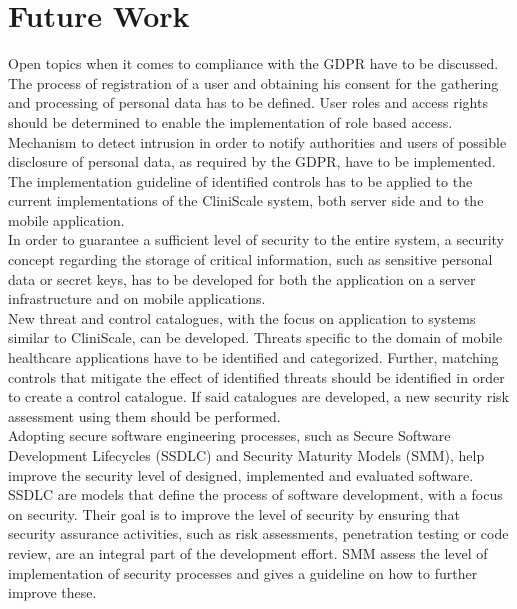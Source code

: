 \section{Future Work}
\label{futurework}
Open topics when it comes to compliance with the GDPR have to be discussed. The process of registration of a user and obtaining his consent for the gathering and processing of personal data has to be defined. User roles and access rights should be determined to enable the implementation of role based access. Mechanism to detect intrusion in order to notify authorities and users of possible disclosure of personal data, as required by the GDPR, have to be implemented.\\
\newline
The implementation guideline of identified controls has to be applied to the current implementations of the CliniScale system, both server side and to the mobile application.\\
\newline
In order to guarantee a sufficient level of security to the entire system, a security concept regarding the storage of critical information, such as sensitive personal data or secret keys, has to be developed for both the application on a server infrastructure and on mobile applications.\\
\newline
New threat and control catalogues, with the focus on application to systems similar to CliniScale, can be developed. Threats specific to the domain of mobile healthcare applications have to be identified and categorized. Further, matching controls that mitigate the effect of identified threats should be identified in order to create a control catalogue. If said catalogues are developed, a new security risk assessment using them should be performed.\\
\newline
Adopting secure software engineering processes, such as Secure Software Development Lifecycles (SSDLC) and Security Maturity Models (SMM), help improve the security level of designed, implemented and evaluated software. SSDLC are models that define the process of software development, with a focus on security. Their goal is to improve the level of security by ensuring that security assurance activities, such as risk assessments, penetration testing or code review, are an integral part of the development effort. SMM assess the level of implementation of security processes and gives a guideline on how to further improve these.
